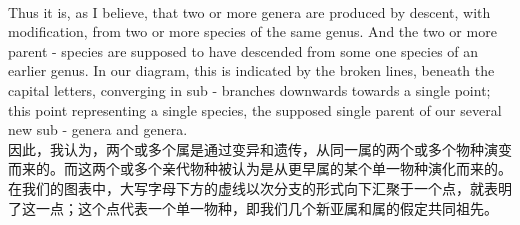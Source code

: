 \documentclass{article}
\begin{document}
\\
Thus it is, as I believe, that two or more genera are produced by descent, with modification, from two or more species of the same genus. And the two or more parent - species are supposed to have descended from some one species of an earlier genus. In our diagram, this is indicated by the broken lines, beneath the capital letters, converging in sub - branches downwards towards a single point; this point representing a single species, the supposed single parent of our several new sub - genera and genera.\\
因此，我认为，两个或多个属是通过变异和遗传，从同一属的两个或多个物种演变而来的。而这两个或多个亲代物种被认为是从更早属的某个单一物种演化而来的。在我们的图表中，大写字母下方的虚线以次分支的形式向下汇聚于一个点，就表明了这一点；这个点代表一个单一物种，即我们几个新亚属和属的假定共同祖先。 
\end{document}
